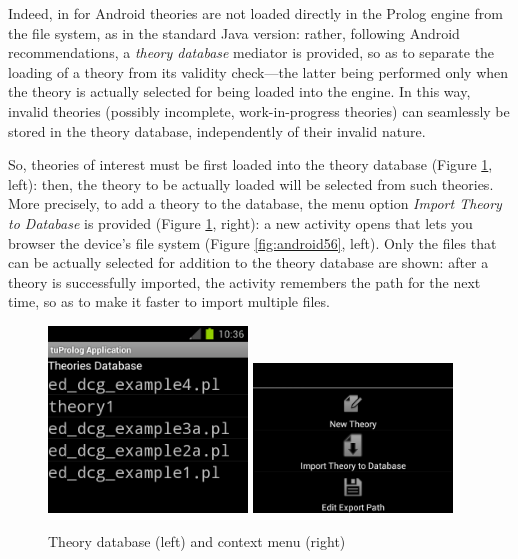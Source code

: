 Indeed, in \tuprolog{} for Android theories are not loaded directly in the Prolog engine from the file system, as in the standard Java version: rather, following Android recommendations, a \textit{theory database} mediator is provided, so as to separate the loading of a theory from its validity check---the latter being performed only when the theory is actually selected for being loaded into the engine. In this way, invalid theories (possibly incomplete, work-in-progress theories) can seamlessly be stored in the theory database, independently of their invalid nature.

So, theories of interest must be first loaded into the theory database (Figure \ref{fig:android34}, left): then, the theory to be actually loaded will be selected from such theories.
%
More precisely, to add a theory to the database, the menu option \textit{Import Theory to Database} is provided (Figure \ref{fig:android34}, right): a new activity opens that lets you browser the device's file system (Figure \ref{fig:android56}, left). Only the files that can be actually selected for addition to the theory database are shown: after a theory is successfully imported, the activity remembers the path for the next time, so as to make it faster to import multiple files.

\begin{figure}
  \includegraphics[width=200px]{images/android3.png}
  \includegraphics[width=200px]{images/android4.png}
  \caption{Theory database (left) and context menu (right)}\label{fig:android34}
\end{figure}

